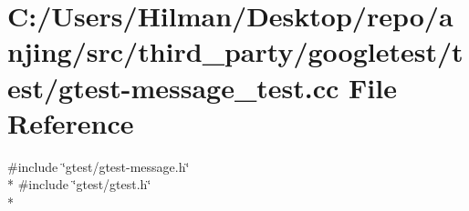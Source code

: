 \hypertarget{gtest-message__test_8cc}{}\section{C\+:/\+Users/\+Hilman/\+Desktop/repo/anjing/src/third\+\_\+party/googletest/test/gtest-\/message\+\_\+test.cc File Reference}
\label{gtest-message__test_8cc}
{\ttfamily \#include \char`\"{}gtest/gtest-\/message.\+h\char`\"{}}\\*
{\ttfamily \#include \char`\"{}gtest/gtest.\+h\char`\"{}}\\*
